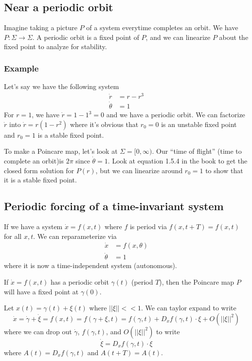 \documentclass{article}
\begin{document}
\subsection{Near a periodic orbit}
Imagine taking a picture $P$ of a system everytime completes an orbit. We have $P: \Sigma\to\Sigma$. A periodic orbit is a fixed point of $P$, and we can linearize $P$ about the fixed point to analyze for stability.

\subsubsection{Example}
Let's say we have the following system 
\begin{align*}
    \dot{r}&=r-r^3\\
    \dot{\theta}&=1
\end{align*}
For $r=1$, we have $\dot{r}=1-1^3=0$ and we have a periodic orbit. We can factorize $\dot{r}$ into $\dot{r}=r(1-r^2)$ where it's obvious that $r_0=0$ is an unstable fixed point and $r_0=1$ is a stable fixed point.

To make a Poincare map, let's look at $\Sigma=[0,\infty)$. Our ``time of flight'' (time to complete an orbit)is $2\pi$ since $\dot{\theta}=1$. Look at equation 1.5.4 in the book to get the closed form solution for $P(r)$, but we can linearize around $r_0=1$ to show that it is a stable fixed point.

\subsection{Periodic forcing of a time-invariant system}
If we have a system $\dot{x}=f(x,t)$ where $f$ is period via $f(x,t+T)=f(x,t)$ for all $x,t$. We can reparameterize via 
\begin{align*}
    \dot{x}&=f(x,\theta)\\
    \dot{\theta} &= 1
\end{align*}
where it is now a time-independent system (autonomous).

If $\dot{x}=f(x,t)$ has a periodic orbit $\gamma(t)$ (period $T$), then the Poincare map $P$ will have a fixed point at $\gamma(0)$.

Let $x(t)=\gamma(t)+\xi(t)$ where $||\xi||<<1$. We can taylor expand to write 
\[\dot{x}=\dot{\gamma}+\dot{\xi}=f(x,t)=f(\gamma+\xi,t)=f(\gamma,t)+D_xf(\gamma,t)\cdot \xi + O(||\xi||^2) \]
where we can drop out $\dot{\gamma}$, $f(\gamma,t)$, and $O(||\xi||^2)$ to write 
\[ \dot{\xi}= D_xf(\gamma,t)\cdot \xi \]
where $A(t)=D_xf(\gamma,t)$ and $A(t+T)=A(t)$.
\end{document}
